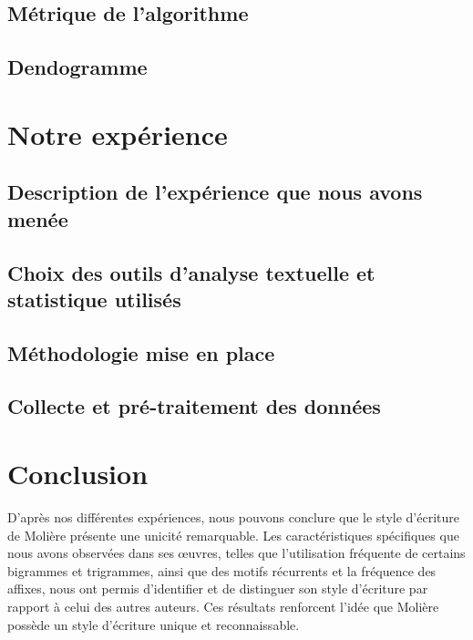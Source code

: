 \documentclass{report} %
\begin{document}
\subsection{Métrique de l'algorithme}

\subsection{Dendogramme}


\section{Notre expérience}

\vspace{\baselineskip}
\subsection{Description de l'expérience que nous avons menée}

\subsection{Choix des outils d'analyse textuelle et statistique utilisés}

\subsection{Méthodologie mise en place}

\subsection{Collecte et pré-traitement des données}


\section{Conclusion}

\hspace{0,5cm}D'après nos différentes expériences, nous
pouvons conclure que le style d'écriture de Molière présente une unicité
remarquable. Les caractéristiques spécifiques que nous avons observées dans ses
œuvres, telles que l'utilisation fréquente de certains bigrammes et trigrammes,
ainsi que des motifs récurrents et la fréquence des affixes, nous ont
permis d'identifier et de distinguer son style d'écriture par rapport à celui
des autres auteurs. Ces résultats renforcent l'idée que Molière possède un style
d'écriture unique et reconnaissable.
\end{document}
